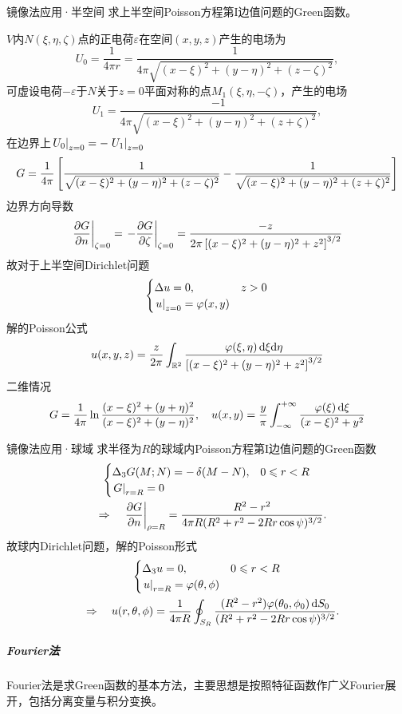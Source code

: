 \begin{example}{镜像法应用·半空间}{}
	求上半空间Poisson方程第I边值问题的Green函数。
	
	$V$内$N(\xi,\eta,\zeta)$点的正电荷$\varepsilon$在空间$(x,y,z)$产生的电场为
	\[
		U_0=\frac1{4\pi r}=\frac1{4\pi\sqrt{(x-\xi)^2+(y-\eta)^2+(z-\zeta)^2}},
	\]
	可虚设电荷$-\varepsilon$于$N$关于$z=0$平面对称的点$M_1(\xi,\eta,-\zeta)$，产生的电场
	\[
		U_1=\frac{-1}{4\pi\sqrt{(x-\xi)^2+(y-\eta)^2+(z+\zeta)^2}},
	\]
	在边界上$\left.U_0\right\rvert_{z=0}=-\left.U_1\right\rvert_{z=0}$
	{\footnotesize
	\[
		G=\frac1{4\pi}\left[\frac1{\sqrt{(x-\xi)^2+(y-\eta)^2+(z-\zeta)^2}}-\frac1{\sqrt{(x-\xi)^2+(y-\eta)^2+(z+\zeta)^2}}\right]
	\]}
	边界方向导数
	\[
		\edg{\pv Gn}_{\zeta=0}=\edg{-\pv G\zeta}_{\zeta=0}=\frac{-z}{2\pi\fkh{(x-\xi)^2+(y-\eta)^2+z^2}^{3/2}}
	\]
	故对于上半空间Dirichlet问题
	\[
		\begin{cases}
		\Delta u=0,&z>0\\
		\left.u\right\rvert_{z=0}=\varphi(x,y)
	\end{cases}
	\]
	解的Poisson公式
	\[
		u(x,y,z)=\frac z{2\pi}\int_{\mathbb R^2}\frac{\varphi(\xi,\eta)\mathop{}\!\mathrm{d}\xi\mathrm{d}\eta}{\left[(x-\xi)^2+(y-\eta)^2+z^2\right]^{3/2}}
	\]
	\tcblower
	二维情况
	\[
		G=\frac1{4\pi}\ln\frac{(x-\xi)^2+(y+\eta)^2}{(x-\xi)^2+(y-\eta)^2},\quad u(x,y)=\frac y\pi\int_{-\infty}^{+\infty}\frac{\varphi(\xi)\mathop{}\!\mathrm{d}\xi}{(x-\xi)^2+y^2}
	\]
\end{example}
\begin{example}{镜像法应用·球域}{}
	求半径为$R$的球域内Poisson方程第I边值问题的Green函数
	\begin{gather*}
		\begin{cases}
			\Delta_3G(M;N)=-\mathop{}\!\delta(M-N),&0\leqslant r<R\\
			\left.G\right\rvert_{r=R}=0
		\end{cases}\\
		\quad\Rightarrow\quad \left.\frac{\partial^{\;\!\!}G}{\partial n^{\;\!\!}}\right\rvert_{\rho=R}=\frac{R^2-r^2}{4\pi R(R^2+r^2-2Rr\cos\psi)^{3/2}}.
	\end{gather*}
	故球内Dirichlet问题，解的Poisson形式
	\begin{gather*}
		\begin{cases}
			\Delta_3u=0,&0\leqslant r<R\\
			\left.u\right\rvert_{r=R}=\varphi(\theta,\phi)
		\end{cases}\\
		\quad\Rightarrow\quad u(r,\theta,\phi)=\frac1{4\pi R}\oint_{S_R}\frac{(R^2-r^2)\varphi(\theta_0,\phi_0)\mathop{}\!\mathrm{d} S_0}{(R^2+r^2-2Rr\cos\psi)^{3/2}}.
	\end{gather*}
\end{example}
\subparagraph*{Fourier法}
Fourier法是求Green函数的基本方法，主要思想是按照特征函数作广义Fourier展开，包括分离变量与积分变换。
